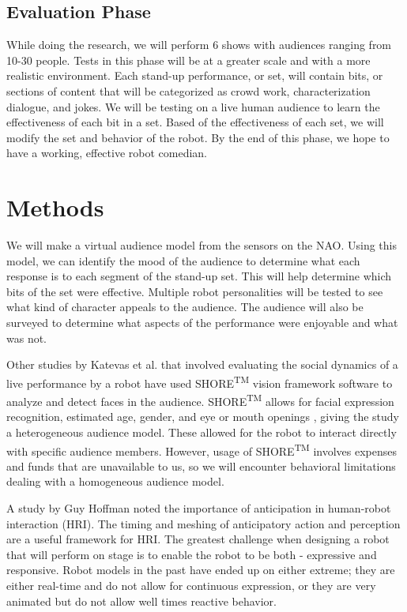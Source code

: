 \documentclass[onecolumn, draftclsnofoot,10pt, compsoc]{IEEEtran}
\begin{document}
\subsection{Evaluation Phase}
While doing the research, we will perform 6 shows with audiences ranging from 10-30 people. Tests in this phase will be at a greater scale and with a more realistic environment. Each stand-up performance, or set, will contain bits, or sections of content that will be categorized as crowd work, characterization dialogue, and jokes. We will be testing on a live human audience to learn the effectiveness of each bit in a set. Based of the effectiveness of each set, we will modify the set and behavior of the robot. By the end of this phase, we hope to have a working, effective robot comedian.

\section{Methods}
We will make a virtual audience model from the sensors on the NAO. Using this model, we can identify the mood of the audience to determine what each response is to each segment of the stand-up set. This will help determine which bits of the set were effective. Multiple robot personalities will be tested to see what kind of character appeals to the audience. The audience will also be surveyed to determine what aspects of the performance were enjoyable and what was not.


Other studies by Katevas et al. \cite{KatevasRobot:2014} that involved evaluating the social dynamics of a live performance by a robot have used SHORE\textsuperscript{TM} vision framework software to analyze and detect faces in the audience. SHORE\textsuperscript{TM} allows for facial expression recognition, estimated age, gender, and eye or mouth openings \cite{SHORE}, giving the study a heterogeneous audience model. These allowed for the robot to interact directly with specific audience members. However, usage of SHORE\textsuperscript{TM} involves expenses and funds that are unavailable to us, so we will encounter behavioral limitations dealing with a homogeneous audience model.

A study by Guy Hoffman {\cite{hoffman2010anticipation}} noted the importance of anticipation in human-robot interaction (HRI). The timing and meshing of anticipatory action and perception are a useful framework for HRI. The greatest challenge when designing a robot that will perform on stage is to enable the robot to be both - expressive and responsive. Robot models in the past have ended up on either extreme; they are either real-time and do not allow for continuous expression, or they are very animated but do not allow well times reactive behavior.
\end{document}
